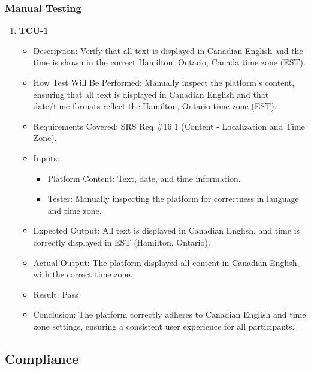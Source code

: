 \documentclass[12pt, titlepage]{article}
\begin{document}
\subsubsection{Manual Testing}
\begin{enumerate}
    \item \textbf{TCU-1}  
    \begin{itemize}
        \item Description: Verify that all text is displayed in Canadian English and the time is shown in the correct Hamilton, Ontario, Canada time zone (EST).
        \item How Test Will Be Performed: Manually inspect the platform's content, ensuring that all text is displayed in Canadian English and that date/time formats reflect the Hamilton, Ontario time zone (EST).
        \item Requirements Covered: SRS Req \#16.1 (Content - Localization and Time Zone).
        \item Inputs:  
            \begin{itemize}
                \item Platform Content: Text, date, and time information.
                \item Tester: Manually inspecting the platform for correctness in language and time zone.
            \end{itemize}
        \item Expected Output: All text is displayed in Canadian English, and time is correctly displayed in EST (Hamilton, Ontario).
        \item Actual Output: The platform displayed all content in Canadian English, with the correct time zone.
        \item Result: Pass
        \item Conclusion: The platform correctly adheres to Canadian English and time zone settings,
		ensuring a consistent user experience for all participants.
    \end{itemize}

\end{enumerate}

\subsection{Compliance}
\end{document}
